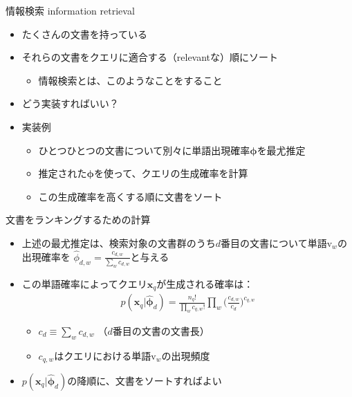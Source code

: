 \documentclass[aspectratio=169,unicode,dvipdfmx,14pt]{beamer}
\begin{document}
\begin{frame}{情報検索 information retrieval}
\begin{itemize}
\item たくさんの文書を持っている
\item それらの文書をクエリに適合する（relevantな）順にソート
\begin{itemize}
\item 情報検索とは、このようなことをすること
\end{itemize}
\item どう実装すればいい？
\item 実装例
\begin{itemize}
\item ひとつひとつの文書について別々に単語出現確率$\bm{\phi}$を最尤推定
\item 推定された$\bm{\phi}$を使って、クエリの生成確率を計算
\item この生成確率を高くする順に文書をソート
\end{itemize}
\end{itemize}
\end{frame}

\begin{frame}{文書をランキングするための計算}
\begin{itemize}
\item 上述の最尤推定は、検索対象の文書群のうち$d$番目の文書について単語$\mbox{v}_w$の出現確率を
$\hat{\phi}_{d,w} = \frac{c_{d,w}}{\sum_w c_{d,w}}$と与える
\item この単語確率によってクエリ$\bm{x}_q$が生成される確率は：
\begin{align}
p(\bm{x}_q | \hat{\bm{\phi}}_d) = \frac{n_q!}{\prod_w c_{q,w}!} \prod_w \bigg( \frac{c_{d,w}}{c_d} \bigg)^{c_{q,w}}
\end{align}
\begin{itemize}
\item $c_d \equiv \sum_w c_{d,w}$ （$d$番目の文書の文書長）
\item $c_{q,w}$はクエリにおける単語$\mbox{v}_w$の出現頻度
\end{itemize}
\item $p(\bm{x}_q | \hat{\bm{\phi}}_d)$の降順に、文書をソートすればよい
\end{itemize}
\end{frame}
\end{document}
